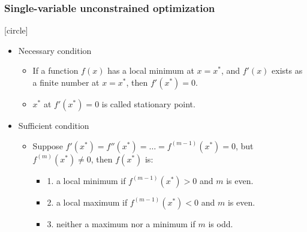 \documentclass{beamer}
\begin{document}
\begin{frame}
    \frametitle{Single-variable unconstrained optimization}
    [circle]
    \begin{itemize}
        \item Necessary condition
        \begin{itemize}
            \item If a function $f(x)$ has a local minimum at $x=x^*$,
            and $f'(x)$ exists as a finite number at $x=x^*$, then $f'(x^*)=0.$
            \item $x^*$ at $f'(x^*)=0$ is called stationary point.
        \end{itemize}
        \item Sufficient condition
        \begin{itemize}
            \item Suppose $f'(x^*)=f''(x^*)=\dots =f^{(m-1)}(x^*)=0$,
            but $f^{(m)}(x^*)\neq 0$, then $f(x^*)$ is:
            \begin{itemize}
                \item 1. a local minimum if $f^{(m-1)}(x^*)>0$ and $m$ is even.
                \item 2. a local maximum if $f^{(m-1)}(x^*)<0$ and $m$ is even.
                \item 3. neither a maximum nor a minimum if $m$ is odd.
            \end{itemize}
        \end{itemize}     
    \end{itemize}
\end{frame}
\end{document}
